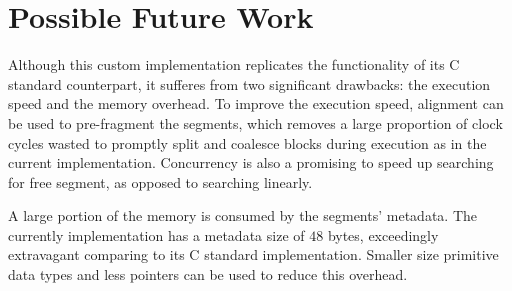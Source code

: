 \documentclass[12pt, letterpaper]{article}
\begin{document}
  \section*{Possible Future Work}
    Although this custom implementation replicates the functionality of its C standard counterpart,
    it sufferes from two significant drawbacks: the execution speed and the memory overhead.
    To improve the execution speed, alignment can be used to pre-fragment the segments,
    which removes a large proportion of clock cycles wasted to promptly split and coalesce blocks during execution as in the current implementation.
    Concurrency is also a promising to speed up searching for free segment, as opposed to searching linearly. 

    A large portion of the memory is consumed by the segments' metadata. 
    The currently implementation has a metadata size of $48$ bytes,
    exceedingly extravagant comparing to its C standard implementation. 
    Smaller size primitive data types and less pointers can be used to reduce this overhead.      
\end{document}
